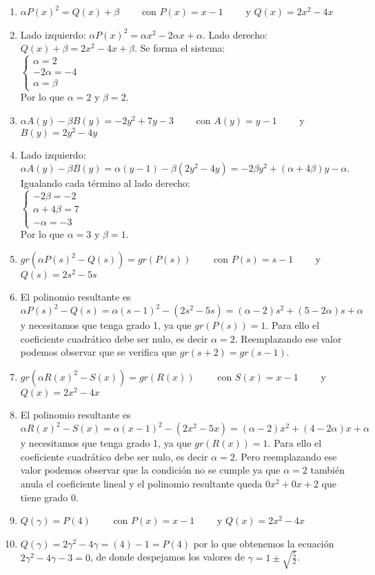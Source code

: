 \documentclass[a4paper]{article}
\newcommand{\answer}{\item[**]}
\newcommand{\SEL}[1]{\left\{\begin{matrix} #1 \end{matrix}\right.}
\newcommand{\df}[2]{\displaystyle\frac{#1}{#2}}
\begin{document}
\begin{enumerate}
\begin{enumerate} [label=(\alph*)]
		\item $\alpha P(x)^2 = Q(x) +\beta$ ~~~~con $P(x)=x-1$ ~~~~y $Q(x)=2x^2-4x$
		\answer Lado izquierdo: $\alpha P(x)^2= \alpha x^2-2 \alpha x+ \alpha$. Lado derecho: $Q(x) +\beta= 2x^2-4x+\beta$. Se forma el sistema: \\ $\SEL{\alpha=2 \\ -2\alpha = -4 \\ \alpha= \beta}$ \\ Por lo que $\alpha=2$ y $\beta=2$.

		\item $\alpha A(y)-\beta B(y) = -2y^2 +7y-3$ ~~~~con $A(y)=y-1$ ~~~~y $B(y)=2y^2-4y$
		\answer Lado izquierdo: $\alpha A(y)-\beta B(y) = \alpha (y-1)- \beta (2y^2-4y)= -2\beta y^2 + (\alpha+4\beta) y - \alpha$. Igualando cada término al lado derecho: \\  $\SEL{-2\beta =-2 \\ \alpha+4\beta=7 \\ -\alpha=-3}$ \\ Por lo que $\alpha=3$ y $\beta=1$.

		\item $gr\left(\alpha P(s)^2 - Q(s)\right)=gr\left(P(s)\right)$ ~~~~con $P(s)=s-1$ ~~~~y $Q(s)=2s^2-5s$
		\answer El polinomio resultante es $\alpha P(s)^2 - Q(s)= \alpha (s-1)^2 - (2s^2-5s)= (\alpha-2) s^2 + (5-2\alpha) s + \alpha$ y necesitamos que tenga grado 1, ya que $gr\left(P(s)\right)=1$. Para ello el coeficiente cuadrático debe ser nulo, es decir $\alpha=2$. Reemplazando ese valor podemos observar que se verifica que $gr(s+2)=gr(s-1)$.

		\item $gr\left(\alpha R(x)^2 - S(x)\right)=gr\left(R(x)\right)$ ~~~~con $S(x)=x-1$ ~~~~y $Q(x)=2x^2-4x$
		\answer El polinomio resultante es $\alpha R(x)^2 - S(x)= \alpha (x-1)^2 - (2x^2-5x)= (\alpha-2) x^2 + (4-2\alpha) x + \alpha$ y necesitamos que tenga grado 1, ya que $gr\left(R(x)\right)=1$. Para ello el coeficiente cuadrático debe ser nulo, es decir $\alpha=2$. Pero reemplazando ese valor podemos observar que la condición no se cumple ya que $\alpha=2$ también anula el coeficiente lineal y el polinomio resultante queda $0x^2+0x+2$ que tiene grado $0$.

		\item $Q(\gamma)=P(4)$ ~~~~con $P(x)=x-1$ ~~~~y $Q(x)=2x^2-4x$
		\answer $Q(\gamma)=2 \gamma^2-4\gamma = (4)-1= P(4)$ por lo que obtenemos la ecuación $2 \gamma^2-4\gamma -3 = 0$, de donde despejamos los valores de $\gamma = 1 \pm \sqrt{\df{5}{2}}$.


\end{enumerate}
\end{enumerate}
\end{document}
